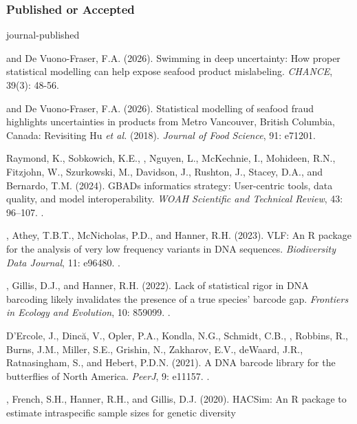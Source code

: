 \subsubsection{Published or Accepted}
\begin{revlist}[itemsep=0.45\baselineskip]{journal-published}
\item \me and \dsup De Vuono-Fraser, F.A. (2026). Swimming in deep uncertainty:
  How proper statistical modelling can help expose seafood product mislabeling.
  \textit{CHANCE}, 39(3): 48-56. 
\item \me and \dsup De Vuono-Fraser, F.A. (2026). Statistical modelling of
  seafood fraud highlights uncertainties in products from Metro Vancouver,
  British Columbia, Canada: Revisiting Hu \textit{et al.} (2018).
  \textit{Journal of Food Science}, 91: e71201.
\item Raymond, K., Sobkowich, K.E., \me, Nguyen, L., McKechnie, I., Mohideen, R.N.,
  Fitzjohn, W., Szurkowski, M., Davidson, J., Rushton, J., Stacey, D.A., and
  Bernardo, T.M. (2024). GBADs informatics strategy: User-centric tools, data
  quality, and model interoperability. \textit{WOAH Scientific and Technical
  Review}, 43: 96--107.
  .
\item \me, Athey, T.B.T., McNicholas, P.D., and Hanner, R.H. (2023). VLF: An R
  package for the analysis of very low frequency variants in DNA sequences.
  \textit{Biodiversity Data Journal}, 11: e96480.
  .
\item \me, Gillis, D.J., and Hanner, R.H. (2022). Lack of statistical rigor in
  DNA barcoding likely invalidates the presence of a true species' barcode gap.
  \textit{Frontiers in Ecology and Evolution}, 10: 859099. .
\item D'Ercole, J., Dincă, V., Opler, P.A., Kondla, N.G., Schmidt, C.B., \me,
  Robbins, R., Burns, J.M., Miller, S.E., Grishin, N., Zakharov, E.V.,
  deWaard, J.R., Ratnasingham, S., and Hebert, P.D.N. (2021). A DNA barcode
  library for the butterflies of North America. \textit{PeerJ}, 9: e11157.
  .
\item \me, \dsup French, S.H., Hanner, R.H., and Gillis, D.J. (2020). HACSim: An
  R package to estimate intraspecific sample sizes for genetic diversity

\end{revlist}
